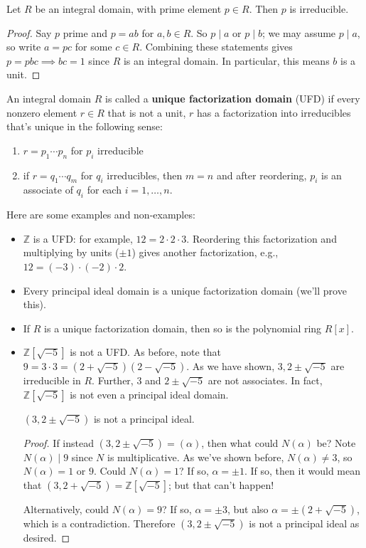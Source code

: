 \documentclass{article}
\theoremstyle{plain}
\newcommand{\Z}{\mathbb{Z}}
\begin{document}
\begin{theorem}{}{}
	Let $R$ be an integral domain, with prime element $p \in R$. Then $p$ is irreducible.	
\end{theorem}
\begin{proof}
	Say $p$ prime and $p = ab$ for $a,b \in R$. So $p\mid a$ or $p\mid b$; we may assume $p\mid a$, so write $a = pc$ for some $c \in R$. Combining these statements gives $p = pbc\implies bc = 1$ since $R$ is an integral domain. In particular, this means $b$ is a unit.	
\end{proof}
\begin{definition}{}{}
	An integral domain $R$ is called a \textbf{unique factorization domain} (UFD) if every nonzero element $r \in R$ that is not a unit, $r$ has a factorization into irreducibles that's unique in the following sense: 
	\begin{enumerate}[(1)]
	\item $r = p_1\cdots p_n$ for $p_i$ irreducible
	\item if $r = q_1 \cdots q_m$ for $q_i$ irreducibles, then $m = n$ and after reordering, $p_i$ is an associate of $q_i$ for each $i = 1,\ldots, n$.
	\end{enumerate}
\end{definition}
Here are some examples and non-examples:
\begin{itemize}
\item $\Z$ is a UFD: for example, $12 = 2 \cdot 2 \cdot 3$. Reordering this factorization and multiplying by units ($\pm 1$) gives another factorization, e.g., $12 = (-3)\cdot (-2) \cdot 2$.
\item Every principal ideal domain is a unique factorization domain (we'll prove this).
\item If $R$ is a unique factorization domain, then so is the polynomial ring $R[x]$.
\item $\Z[\sqrt{-5}]$ is not a UFD. As before, note that $9 = 3 \cdot 3 = (2 + \sqrt{-5})(2 - \sqrt{-5})$. As we have shown, $3, 2\pm \sqrt{-5}$ are irreducible in $R$. Further, $3$ and $2\pm \sqrt{-5}$ are not associates. In fact, $\Z[\sqrt{-5}]$ is not even a principal ideal domain.
	\begin{theorem}{}{}
	$(3, 2\pm\sqrt{-5})$ is not a principal ideal.	
	\end{theorem}
	\begin{proof}
	If instead $(3, 2\pm\sqrt{-5}) = (\alpha)$, then what could $N(\alpha)$	be? Note $N(\alpha)\mid 9$ since $N$ is multiplicative. As we've shown before, $N(\alpha) \ne 3$, so $N(\alpha) = 1$ or $9$. Could $N(\alpha) = 1$? If so, $\alpha = \pm 1$. If so, then it would mean that $(3,2+\sqrt{-5}) = \Z[\sqrt{-5}]$; but that can't happen!
	
	Alternatively, could $N(\alpha) = 9$? If so, $\alpha = \pm 3$, but also $\alpha = \pm(2 + \sqrt{-5})$, which is a contradiction. Therefore $(3, 2\pm\sqrt{-5})$ is not a principal ideal as desired.	
	\end{proof}
\end{itemize}
\end{document}
